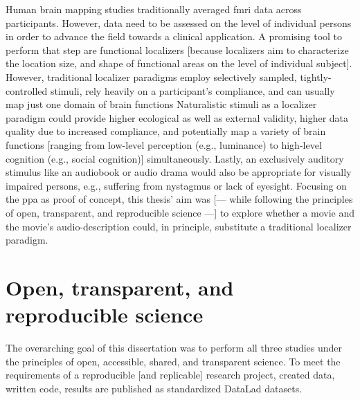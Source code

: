 Human brain mapping studies traditionally averaged \ac{fmri} data across
participants.
%
However, data need to be assessed on the level of individual persons in order to
advance the field towards a clinical application.
A promising tool to perform that step are functional localizers [because
localizers aim to characterize the location size, and shape of functional areas
on the level of individual subject].
However, traditional localizer paradigms employ selectively sampled,
tightly-controlled stimuli, rely heavily on a participant's compliance, and can
usually map just one domain of brain functions
Naturalistic stimuli as a localizer paradigm could provide higher ecological as
well as external validity, higher data quality due to increased compliance, and
potentially map a variety of brain functions [ranging from low-level perception
(e.g., luminance) to high-level cognition (e.g., social cognition)]
simultaneously.
Lastly, an exclusively auditory stimulus like an audiobook or audio drama would
also be appropriate for visually impaired persons, e.g., suffering from
nystagmus or lack of eyesight.
Focusing on the \ac{ppa} as proof of concept, this thesis' aim was [--- while
following the principles of open, transparent, and reproducible science ---] to
explore whether a movie and the movie's audio-description could, in principle,
substitute a traditional localizer paradigm.

\section{Open, transparent, and reproducible science}
The overarching goal of this dissertation was to perform all three studies under
the principles of open, accessible, shared, and transparent science.
To meet the requirements of a reproducible [and replicable] research project,
created data, written code, results are published as standardized DataLad
\citep[\href{www.datalad.org}{datalad.org};][]{halchenko2021datalad} datasets.

